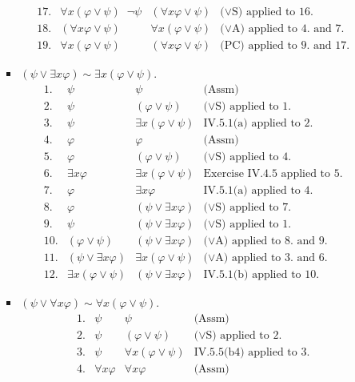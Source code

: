 \begin{enumerate}[1.]
\begin{enumerate}[(1)]
\begin{itemize}
\[\begin{array}{llll}
17. & \forall x (\varphi \lor \psi) \;\; \neg \psi & (\forall x \varphi \lor \psi) & \mbox{($\lor$S) applied to 16.} \\
18. & (\forall x \varphi \lor \psi) & \forall x (\varphi \lor \psi) & \mbox{($\lor$A) applied to 4. and 7.} \\
19. & \forall x (\varphi \lor \psi) & (\forall x \varphi \lor \psi) & \mbox{(PC) applied to 9. and 17.}
\end{array}
\]
\item $(\psi \lor \exists x \varphi) \sim \exists x (\varphi \lor \psi)$.
\[
\begin{array}{llll}
1. & \psi & \psi & \mbox{(Assm)} \\
2. & \psi & (\varphi \lor \psi) & \mbox{($\lor$S) applied to 1.} \\
3. & \psi & \exists x (\varphi \lor \psi) & \mbox{IV.5.1(a) applied to 2.} \\
4. & \varphi & \varphi & \mbox{(Assm)} \\
5. & \varphi & (\varphi \lor \psi) & \mbox{($\lor$S) applied to 4.} \\
6. & \exists x \varphi & \exists x (\varphi \lor \psi) & \mbox{Exercise IV.4.5 applied to 5.} \\
7. & \varphi & \exists x \varphi & \mbox{IV.5.1(a) applied to 4.} \\
8. & \varphi & (\psi \lor \exists x \varphi) & \mbox{($\lor$S) applied to 7.} \\
9. & \psi & (\psi \lor \exists x \varphi) & \mbox{($\lor$S) applied to 1.} \\
10. & (\varphi \lor \psi) & (\psi \lor \exists x \varphi) & \mbox{($\lor$A) applied to 8. and 9.} \\
11. & (\psi \lor \exists x \varphi) & \exists x (\varphi \lor \psi) & \mbox{($\lor$A) applied to 3. and 6.} \\
12. & \exists x (\varphi \lor \psi) & (\psi \lor \exists x \varphi) & \mbox{IV.5.1(b) applied to 10.}
\end{array}
\]
\item $(\psi \lor \forall x \varphi) \sim \forall x (\varphi \lor \psi)$.
\[
\begin{array}{llll}
1. & \psi & \psi & \mbox{(Assm)} \\
2. & \psi & (\varphi \lor \psi) & \mbox{($\lor$S) applied to 2.} \\
3. & \psi & \forall x (\varphi \lor \psi) & \mbox{IV.5.5(b4) applied to 3.} \\
4. & \forall x \varphi & \forall x \varphi & \mbox{(Assm)} \\

\end{array}\]
\end{itemize}
\end{enumerate}
\end{enumerate}
